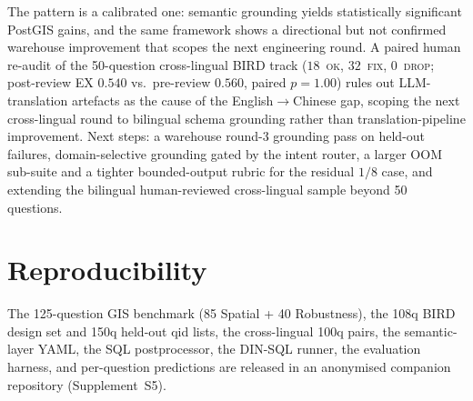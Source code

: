 \documentclass[11pt]{article}
\begin{document}
\begin{sloppypar}
The pattern is a calibrated one: semantic grounding yields statistically significant PostGIS gains, and the same framework shows a directional but not confirmed warehouse improvement that scopes the next engineering round. A paired human re-audit of the 50-question cross-lingual BIRD track ($18$~\textsc{ok}, $32$~\textsc{fix}, $0$~\textsc{drop}; post-review EX $0.540$ vs.\ pre-review $0.560$, paired $p=1.00$) rules out LLM-translation artefacts as the cause of the English$\to$Chinese gap, scoping the next cross-lingual round to bilingual schema grounding rather than translation-pipeline improvement. Next steps: a warehouse round-3 grounding pass on held-out failures, domain-selective grounding gated by the intent router, a larger OOM sub-suite and a tighter bounded-output rubric for the residual $1/8$ case, and extending the bilingual human-reviewed cross-lingual sample beyond 50 questions.

\end{sloppypar}

\section*{Reproducibility}
The 125-question GIS benchmark (85 Spatial + 40 Robustness), the 108q BIRD design set and 150q held-out qid lists, the cross-lingual 100q pairs, the semantic-layer YAML, the SQL postprocessor, the DIN-SQL runner, the evaluation harness, and per-question predictions are released in an anonymised companion repository (Supplement~S5).



\end{document}
